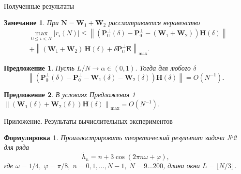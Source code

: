 \documentclass[notheorems, handout]{beamer}
\newtheorem{remark}{Замечание}
\newtheorem{sentence}{Предложение}
\newtheorem{formulation}{Формулировка}
\newcommand{\norm}[1]{\left\|#1\right\|}
\begin{document}
	\begin{frame}{Полученные результаты}
		\begin{remark}
			При $\mathbf{N}=\mathbf{W}_1 + \mathbf{W}_2$ рассматривается неравенство
			\begin{align*}
				&\max_{0\leqslant i<N} |r_i(N)|\leqslant \norm{\left(\mathbf{P}_0^\bot(\delta)- \mathbf{P}_0^\bot-(\mathbf{W}_1+\mathbf{W}_2)\right)\mathbf{H}(\delta)}
				\\
				&+\norm{(\mathbf{W}_1+\mathbf{W}_2)\, \mathbf{H}(\delta) + \delta \mathbf{P}_0^\perp \mathbf{E}}_{\max}.
			\end{align*}
		\end{remark}
		\begin{sentence}
			Пусть $L/N\rightarrow\alpha\in(0,1)$. Тогда для любого $\delta$
			\begin{equation*}
				\norm{\left(\mathbf{P}_0^\bot(\delta) - \mathbf{P}_0^\bot - \mathbf{W}_1(\delta) - \mathbf{W}_2(\delta)\right)\mathbf{H}(\delta)} = O(N^{-1}).
			\end{equation*}
		\end{sentence}
		\begin{sentence}
			В условиях Предложения 1 $\norm{(\mathbf{W}_1(\delta)+\mathbf{W}_2(\delta))\mathbf{H}(\delta)}_{\max}=O(N^{-1})$.
		\end{sentence}
	\end{frame}
	\begin{frame}{Приложение. Результаты вычислительных экспериментов}
		\begin{formulation}
				\textit{Проиллюстрировать теоретический результат задачи №2 для ряда
				\begin{equation*}
					\widetilde{h}_n = n + 3\cos(2\pi n\omega + \varphi),
				\end{equation*}
				где $\omega = 1/4,\;\varphi = \pi/8,\;n=0,1,\dots,N-1,\;N=9\dots200$, длина окна $L=\lfloor N/3\rfloor$.}
		\end{formulation}
	\end{frame}
\end{document}
